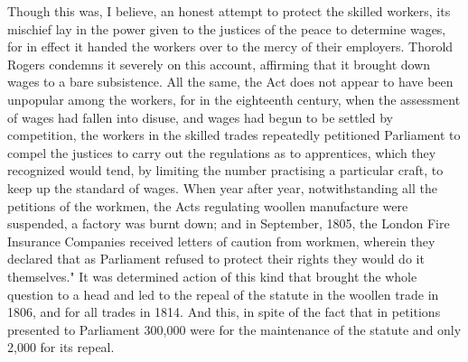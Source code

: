 \documentclass{book}
\begin{document}
Though this was, I believe, an honest attempt to protect the skilled workers, its mischief lay in the power given to the justices of the peace to determine wages, for in effect it handed the workers over to the mercy of their employers. Thorold Rogers condemns it severely on this account, affirming that it brought down wages to a bare subsistence. All the same, the Act does not appear to have been unpopular among the workers, for in the eighteenth century, when the assessment of wages had fallen into disuse, and wages had begun to be settled by competition, the workers in the skilled trades repeatedly petitioned Parliament to compel the justices to carry out the regulations as to apprentices, which they recognized would tend, by limiting the number practising a particular craft, to keep up the standard of wages. When year after year, notwithstanding all the petitions of the workmen, the Acts regulating woollen manufacture were suspended, a factory was burnt down; and in September, 1805, the London Fire Insurance Companies received letters of caution from workmen, wherein they declared that as Parliament refused to protect their rights they would do it themselves." It was determined action of this kind that brought the whole question to a head and led to the repeal of the statute in the woollen trade in 1806, and for all trades in 1814. And this, in spite of the fact that in petitions presented to Parliament 300,000 were for the maintenance of the statute and only 2,000 for its repeal.\footnotemark[7]
\end{document}
